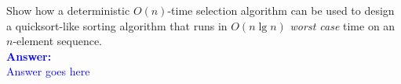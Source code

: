 \item{}
Show how a deterministic $O(n)$-time selection algorithm can be used to design a
quicksort-like sorting algorithm that runs in $O(n\lg n)$ \emph{worst case} time
on an $n$-element sequence.\\[12pt]
\ifanswers
\textcolor{blue}{
\textbf{Answer:}\\[6pt]
Answer goes here
}
\newpage
\fi

